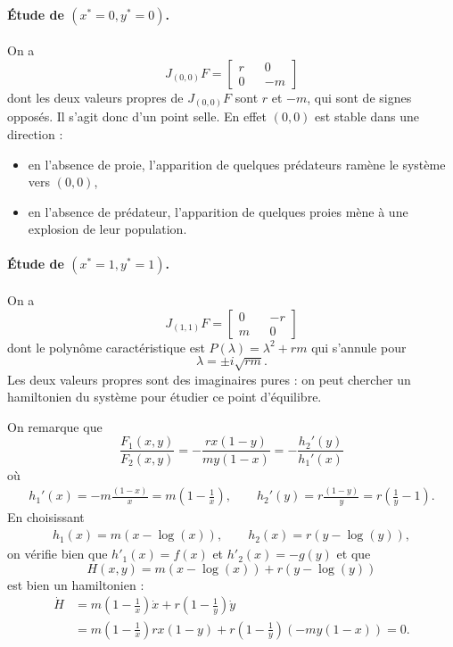 \paragraph*{\'Etude de $(x^* = 0, y^* = 0)$.}
On a 
$$
J_{(0, 0)}F = 
  \left[\begin{array}{rcr} 
    r  & & 0 \\
    0 & & -m 
  \end{array}\right]
$$
dont les deux valeurs propres de $J_{(0, 0)}F$ sont $r$ et $-m$, qui sont de signes opposés. Il s'agit donc d'un point selle. En effet $(0, 0)$ est stable dans une direction : 
\begin{itemize}
  \item en l'absence de proie, l'apparition de quelques prédateurs ramène le système vers $(0, 0)$, 
  \item en l'absence de prédateur, l'apparition de quelques proies mène à une explosion de leur population.
\end{itemize}
  
\paragraph*{\'Etude de $(x^* = 1, y^* = 1)$.}
On a 
$$
J_{(1, 1)}F = 
  \left[\begin{array}{rcr} 
    0 & & -r  \\
    m  & & 0
  \end{array}\right]
$$
dont le polynôme caractéristique est $P(\lambda) = \lambda^2 + rm$ qui s'annule pour
$$
\lambda = \pm i \sqrt{rm}.
$$
Les deux valeurs propres sont des imaginaires pures : on peut chercher un hamiltonien du système pour étudier ce point d'équilibre.

\bigskip
On remarque que 
$$
\frac{F_1(x, y)}{F_2(x, y)} = -\frac{rx(1-y)}{my(1-x)} = - \frac{h_2'(y)}{h_1'(x)}
$$
où
\begin{align*}
h_1'(x) = -m \frac{(1-x)}{x} = m \left(1 - \frac1x\right), \qquad
h_2'(y) = r \frac{(1-y)}{y} = r \left(\frac1y - 1\right).
\end{align*}
En choisissant 
\begin{align*}
  h_1(x) = m(x-\log(x)), \qquad h_2(x) = r(y-\log(y)),
\end{align*}
on vérifie bien que $h'_1(x) = f(x)$ et $h'_2(x) = -g(y)$ et que 
$$
H(x, y) = m(x-\log(x)) + r(y-\log(y))
$$
est bien un hamiltonien : 
\begin{align*}
\dot H 
& = m\left(1 - \frac1x\right) \dot x + r \left(1 - \frac1y\right) \dot y \\
& = m\left(1 - \frac1x\right) r x (1 - y) + r \left(1 - \frac1y\right) (- m y (1 - x)) 
= 0.
\end{align*}

